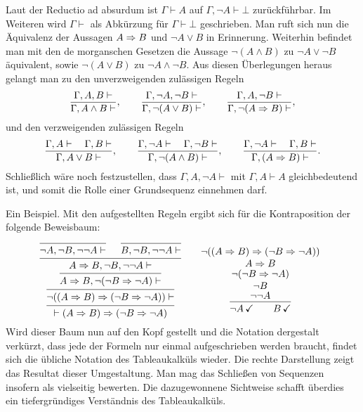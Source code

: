 Laut der Reductio ad absurdum ist $\Gamma\vdash A$ auf
$\Gamma,\lnot A\vdash\bot$ zurückführbar. Im Weiteren wird $\Gamma\vdash$
als Abkürzung für $\Gamma\vdash\bot$ geschrieben. Man ruft sich nun
die Äquivalenz der Aussagen $A\Rightarrow B$ und $\lnot A\lor B$ in Erinnerung.
Weiterhin befindet man mit den de morganschen Gesetzen die Aussage
$\lnot (A\land B)$ zu $\lnot A\lor\lnot B$ äquivalent, sowie $\lnot (A\lor B)$
zu $\lnot A\land\lnot B$. Aus diesen Überlegungen heraus
gelangt man zu den unverzweigenden zulässigen Regeln%
\[
\dfrac{\Gamma,A,B\vdash}{\Gamma,A\land B\vdash},\qquad
\dfrac{\Gamma,\lnot A,\lnot B\vdash}{\Gamma,\lnot (A\lor B)\vdash},\qquad
\dfrac{\Gamma,A,\lnot B\vdash}{\Gamma,\lnot(A\Rightarrow B)\vdash},
\]
und den verzweigenden zulässigen Regeln
\[
\dfrac{\Gamma,A\vdash\quad\Gamma,B\vdash}{\Gamma,A\lor B\vdash},\qquad
\dfrac{\Gamma,\lnot A\vdash\quad\Gamma,\lnot B\vdash}{\Gamma,\lnot (A\land B)\vdash},\qquad
\dfrac{\Gamma,\lnot A\vdash\quad\Gamma,B\vdash}{\Gamma,(A\Rightarrow B)\vdash}.
\]
Schließlich wäre noch festzustellen, dass $\Gamma,A,\lnot A\vdash$
mit $\Gamma,A\vdash A$ gleichbedeutend ist, und somit die Rolle einer
Grundsequenz einnehmen darf.

Ein Beispiel. Mit den aufgestellten Regeln ergibt sich für die
Kontraposition der folgende Beweisbaum:
\[\begin{array}{@{}l@{\qquad}l}
\begin{prooftree}
        \infer0{\lnot A, \lnot B, \lnot\lnot A\vdash}
        \infer0{B, \lnot B, \lnot\lnot A\vdash}
      \infer2{A\cond B, \lnot B, \lnot\lnot A\vdash}
    \infer1{A\cond B, \lnot(\lnot B\cond\lnot A)\vdash}
  \infer1{\lnot ((A\cond B)\cond (\lnot B\cond\lnot A))\vdash}
\infer1{\vdash (A\cond B)\cond (\lnot B\cond\lnot A)}
\end{prooftree}
&
\begin{prooftree}[proof style = downwards, separation = 2em, rule margin = 0.7ex]
          \hypo{\lnot A\,\checkmark}
          \hypo{B\,\checkmark}
        \infer2{\lnot\lnot A}
      \infer[rule style = no rule]1{\lnot B}
    \infer[rule style = no rule]1{\lnot(\lnot B\cond\lnot A)}
  \infer[rule style = no rule]1{A\cond B}
\infer[rule style = no rule]1{\lnot ((A\cond B)\cond (\lnot B\cond\lnot A))}
\end{prooftree}
\end{array}\]
Wird dieser Baum nun auf den Kopf gestellt und die Notation dergestalt
verkürzt, dass jede der Formeln nur einmal aufgeschrieben werden
braucht, findet sich die übliche Notation des Tableaukalküls wieder. Die
rechte Darstellung zeigt das Resultat dieser Umgestaltung. Man mag das Schließen
von Sequenzen insofern als vielseitig bewerten. Die dazugewonnene Sichtweise
schafft überdies ein tiefergründiges Verständnis des Tableaukalküls.


